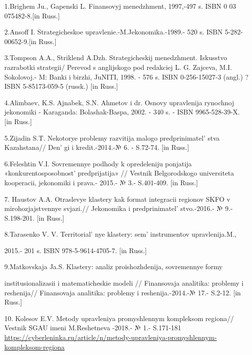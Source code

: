\begin{references}

1.Brighem Ju., Gapenski L. Finansovyj menedzhment, 1997,-497 s. ISBN 0
03 075482-8.{[}in Russ.{]}

2.Ansoff I. Strategicheskoe upravlenie.-M.Jekonomika.-1989.- 520 s. ISBN
5-282-00652-9.{[}in Russ.{]}

3.Tompson A.A., Striklend A.Dzh. Strategicheskij menedzhment. Iskusstvo
razrabotki strategii/ Perevod s anglijskogo pod redakciej L. G. Zajceva,
M.I. Sokolovoj.- M: Banki i birzhi, JuNITI, 1998. - 576 s. ISBN
0-256-15027-3 (angl.) ?ISBN 5-85173-059-5 (russk.) {[}in Russ.{]}

4.Alimbaev, K.S. Ajnabek, S.N. Ahmetov i dr. Osnovy upravlenija
rynochnoj jekonomiki - Karaganda: Bolashak-Baspa, 2002. - 340 s. - ISBN
9965-528-39-X. {[}in Russ.{]}

5.Zijadin S.T. Nekotorye problemy razvitija malogo
predprinimatel' stva Kazahstana// Den' gi
i kredit.-2014.-№ 6. - S.72-74. {[}in Russ.{]}

6.Feleshtin V.I. Sovremennye podhody k opredeleniju ponjatija
«konkurentosposobnost'{} predprijatija» // Vestnik
Belgorodskogo universiteta kooperacii, jekonomiki i prava.- 2015.- № 3.-
S.401-409. {[}in Russ.{]}

7. Haustov A.A. Otraslevye klastery kak format integracii regionov SKFO
v mirohozjajstvennye svjazi.// Jekonomika i
predprinimatel' stvo.-2016.- № 9.- S.198-201. {[}in
Russ.{]}

8.Tarasenko V. V. Territorial' nye klastery:
sem'{} instrumentov upravlenija.M.,

2015.- 201 s. ISBN 978-5-9614-4705-7. {[}in Russ.{]}

9.Matkovskaja Ja.S. Klastery: analiz proishozhdenija, sovremennye formy

institusionalizasii i matematicheskie modeli // Finansovaja analitika:
problemy i reshenija// Finansovaja analitika: problemy i
reshenija.-2014.-№ 17.- S.2-12. {[}in Russ.{]}

10. Kolesov E.V. Metody upravleniya promyshlennym kompleksom regiona//
Vestnik SGAU imeni M.Reshetneva -2018.- № 1.- S.171-181 \url{https://cyberleninka.ru/article/n/metody-upravleniya-promyshlennym-kompleksom-regiona}
\end{references}
